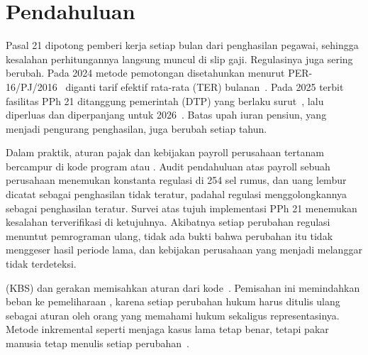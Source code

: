\section{Pendahuluan}
\label{sec:pendahuluan}

 Pasal 21 dipotong pemberi kerja setiap bulan dari penghasilan pegawai, sehingga kesalahan perhitungannya langsung muncul di slip gaji. Regulasinya juga sering berubah. Pada 2024 metode pemotongan disetahunkan menurut PER-16/PJ/2016~\cite{per16_2016} diganti tarif efektif rata-rata (TER) bulanan~\cite{pp58_2023,pmk168_2023}. Pada 2025 terbit fasilitas PPh 21 ditanggung pemerintah (DTP) yang berlaku surut~\cite{pmk10_2025}, lalu diperluas dan diperpanjang untuk 2026~\cite{pmk72_2025,pmk105_2025}. Batas upah iuran pensiun, yang menjadi pengurang penghasilan, juga berubah setiap tahun.

Dalam praktik, aturan pajak dan kebijakan payroll perusahaan tertanam bercampur di kode program atau . Audit pendahuluan atas  payroll sebuah perusahaan menemukan konstanta regulasi di 254 sel rumus, dan uang lembur dicatat sebagai penghasilan tidak teratur, padahal regulasi menggolongkannya sebagai penghasilan teratur. Survei atas tujuh implementasi PPh 21  menemukan kesalahan terverifikasi di ketujuhnya. Akibatnya setiap perubahan regulasi menuntut pemrograman ulang, tidak ada bukti bahwa perubahan itu tidak menggeser hasil periode lama, dan kebijakan perusahaan yang menjadi melanggar tidak terdeteksi.

 (KBS) dan gerakan  memisahkan aturan dari kode~\cite{merigoux2021catala,mowbray2023scaling}. Pemisahan ini memindahkan beban ke pemeliharaan , karena setiap perubahan hukum harus ditulis ulang sebagai aturan oleh orang yang memahami hukum sekaligus representasinya. Metode inkremental seperti  menjaga kasus lama tetap benar, tetapi pakar manusia tetap menulis setiap perubahan~\cite{compton2021rippledown}.

